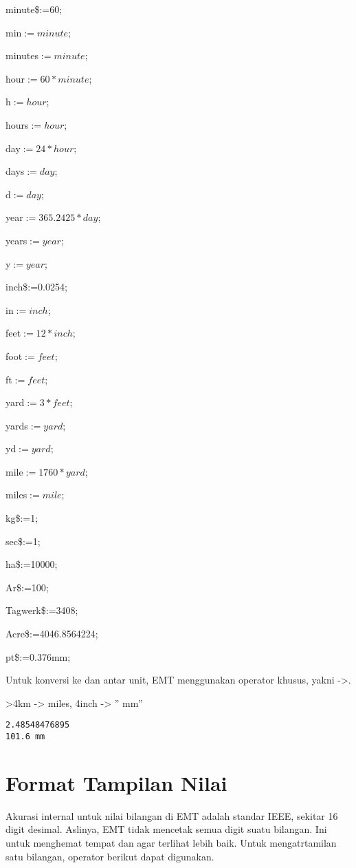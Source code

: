 \documentclass[
]{book}
\begin{document}
minute\$:=60;

min\(:=minute\);

minutes\(:=minute\);

hour\(:=60*minute\);

h\(:=hour\);

hours\(:=hour\);

day\(:=24*hour\);

days\(:=day\);

d\(:=day\);

year\(:=365.2425*day\);

years\(:=year\);

y\(:=year\);

inch\$:=0.0254;

in\(:=inch\);

feet\(:=12*inch\);

foot\(:=feet\);

ft\(:=feet\);

yard\(:=3*feet\);

yards\(:=yard\);

yd\(:=yard\);

mile\(:=1760*yard\);

miles\(:=mile\);

kg\$:=1;

sec\$:=1;

ha\$:=10000;

Ar\$:=100;

Tagwerk\$:=3408;

Acre\$:=4046.8564224;

pt\$:=0.376mm;

Untuk konversi ke dan antar unit, EMT menggunakan operator khusus, yakni -\textgreater.

\textgreater4km -\textgreater{} miles, 4inch -\textgreater{} '' mm''

\begin{verbatim}
2.48548476895
101.6 mm
\end{verbatim}

\chapter{Format Tampilan Nilai}\label{format-tampilan-nilai}

Akurasi internal untuk nilai bilangan di EMT adalah standar IEEE, sekitar 16 digit desimal. Aslinya, EMT tidak mencetak semua digit suatu bilangan. Ini untuk menghemat tempat dan agar terlihat lebih baik. Untuk mengatrtamilan satu bilangan, operator berikut dapat digunakan.
\end{document}
